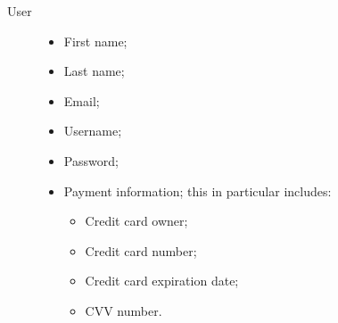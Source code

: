 \begin{description}
				\item[User] 
				\begin{itemize}
					\item First name;
					\item Last name; 
					\item Email;
					\item Username;
					\item Password;
					\item Payment information; this in particular includes:
						\begin{itemize}
							\item Credit card owner;
							\item Credit card number;
							\item Credit card expiration date;
							\item CVV number.
						\end{itemize}
				\end{itemize}
				

\end{description}
